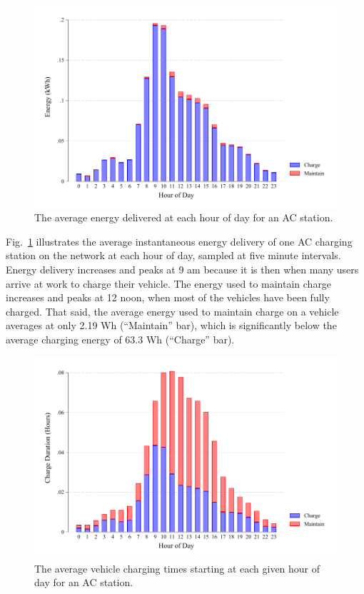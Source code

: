 \begin{figure}[H]
	\centering
	\includegraphics[width=0.8\linewidth]{ac_h_e}
	\caption[Energy delivered for an AC station at each hour of day]{The average energy delivered at each hour of day for an AC station.}
	\label{fig:10:ac_h_e}
\end{figure}

Fig.~\ref{fig:10:ac_h_e} illustrates the average instantaneous energy delivery of one AC charging station on the network at each hour of day, sampled at five minute intervals. Energy delivery increases and peaks at 9 am because it is then when many users arrive at work to charge their vehicle. The energy used to maintain charge increases and peaks at 12 noon, when most of the vehicles have been fully charged. That said, the average energy used to maintain charge on a vehicle averages at only 2.19 Wh (``Maintain'' bar), which is significantly below the average charging energy of 63.3 Wh (``Charge'' bar).

\begin{figure}[H]
	\centering
	\includegraphics[width=0.8\linewidth]{ac_h_c}
	\caption[Vehicle charging times at each hour of day]{The average vehicle charging times starting at each given hour of day for an AC station.}
	\label{fig:10:ac_h_c}
\end{figure}


